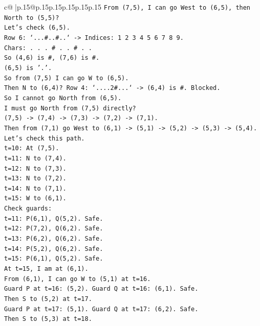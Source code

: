 \documentclass{article}
\begin{document}
{\begin{supertabular}{c@{$\;$}|p{.15\linewidth}@{}p{.15\linewidth}p{.15\linewidth}p{.15\linewidth}p{.15\linewidth}p{.15\linewidth}}
{{{\texttt{From (7,5), I can go West to (6,5), then North to (5,5)?} \\
\texttt{Let's check (6,5).} \\
\texttt{Row 6: `...\#..\#..` {-}> Indices: 1 2 3 4 5 6 7 8 9.} \\
\texttt{Chars: . . . \# . . \# . .} \\
\texttt{So (4,6) is \#, (7,6) is \#.} \\
\texttt{(6,5) is '.'.} \\
\texttt{So from (7,5) I can go W to (6,5).} \\
\texttt{Then N to (6,4)? Row 4: `....2\#...` {-}> (6,4) is \#. Blocked.} \\
\texttt{So I cannot go North from (6,5).} \\
\texttt{I must go North from (7,5) directly?} \\
\texttt{(7,5) {-}> (7,4) {-}> (7,3) {-}> (7,2) {-}> (7,1).} \\
\texttt{Then from (7,1) go West to (6,1) {-}> (5,1) {-}> (5,2) {-}> (5,3) {-}> (5,4).} \\
\texttt{Let's check this path.} \\
\texttt{t=10: At (7,5).} \\
\texttt{t=11: N to (7,4).} \\
\texttt{t=12: N to (7,3).} \\
\texttt{t=13: N to (7,2).} \\
\texttt{t=14: N to (7,1).} \\
\texttt{t=15: W to (6,1).} \\
\texttt{Check guards:} \\
\texttt{t=11: P(6,1), Q(5,2). Safe.} \\
\texttt{t=12: P(7,2), Q(6,2). Safe.} \\
\texttt{t=13: P(6,2), Q(6,2). Safe.} \\
\texttt{t=14: P(5,2), Q(6,2). Safe.} \\
\texttt{t=15: P(6,1), Q(5,2). Safe.} \\
\texttt{At t=15, I am at (6,1).} \\
\texttt{From (6,1), I can go W to (5,1) at t=16.} \\
\texttt{Guard P at t=16: (5,2). Guard Q at t=16: (6,1). Safe.} \\
\texttt{Then S to (5,2) at t=17.} \\
\texttt{Guard P at t=17: (5,1). Guard Q at t=17: (6,2). Safe.} \\
\texttt{Then S to (5,3) at t=18.} \\
}}}
\end{supertabular}}
\end{document}
